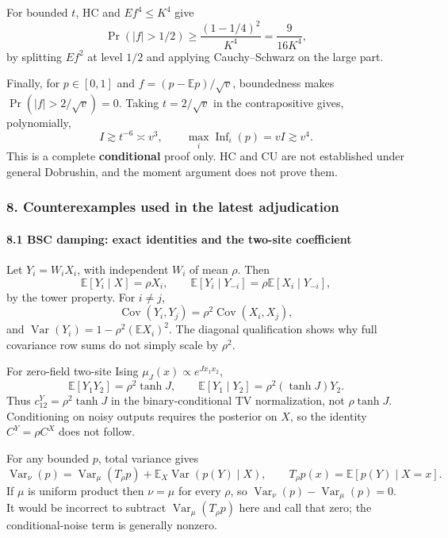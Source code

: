 For bounded \(t\), HC and \(Ef^4\le K^4\) give
\[\Pr(|f|>1/2)\ge\frac{(1-1/4)^2}{K^4}=\frac9{16K^4},\]
by splitting \(Ef^2\) at level \(1/2\) and applying Cauchy--Schwarz on the large part.

Finally, for \(p\in[0,1]\) and \(f=(p-\mathbb Ep)/\sqrt v\), boundedness makes \(\Pr(|f|>2/\sqrt v)=0\). Taking \(t=2/\sqrt v\) in the contrapositive gives, polynomially,
\[I\gtrsim t^{-6}\asymp v^3,
\qquad \max_i\operatorname{Inf}_i(p)=vI\gtrsim v^4.\]
This is a complete \textbf{conditional} proof only. HC and CU are not established under general Dobrushin, and the moment argument does not prove them.

\subsubsection{8. Counterexamples used in the latest adjudication}\label{counterexamples-used-in-the-latest-adjudication}

\paragraph{8.1 BSC damping: exact identities and the two-site coefficient}\label{bsc-damping-exact-identities-and-the-two-site-coefficient}

Let \(Y_i=W_iX_i\), with independent \(W_i\) of mean \(\rho\). Then
\[\mathbb E[Y_i\mid X]=\rho X_i,\qquad
\mathbb E[Y_i\mid Y_{-i}]=\rho\mathbb E[X_i\mid Y_{-i}],\]
by the tower property. For \(i\ne j\),
\[\operatorname{Cov}(Y_i,Y_j)=\rho^2\operatorname{Cov}(X_i,X_j),\]
and \(\operatorname{Var}(Y_i)=1-\rho^2(\mathbb E X_i)^2\). The diagonal qualification shows why full covariance row sums do not simply scale by \(\rho^2\).

For zero-field two-site Ising \(\mu_J(x)\propto e^{Jx_1x_2}\),
\[\mathbb E[Y_1Y_2]=\rho^2\tanh J,
\qquad \mathbb E[Y_1\mid Y_2]=\rho^2(\tanh J)Y_2.\]
Thus \(c_{12}^Y=\rho^2\tanh J\) in the binary-conditional TV normalization, not \(\rho\tanh J\). Conditioning on noisy outputs requires the posterior on \(X\), so the identity \(C^Y=\rho C^X\) does not follow.

For any bounded \(p\), total variance gives
\[\operatorname{Var}_\nu(p)=\operatorname{Var}_\mu(T_\rho p)
+\mathbb E_X\operatorname{Var}(p(Y)\mid X),\qquad T_\rho p(x)=\mathbb E[p(Y)\mid X=x].\]
If \(\mu\) is uniform product then \(\nu=\mu\) for every \(\rho\), so \(\operatorname{Var}_\nu(p)-\operatorname{Var}_\mu(p)=0\). It would be incorrect to subtract \(\operatorname{Var}_\mu(T_\rho p)\) here and call that zero; the conditional-noise term is generally nonzero.

